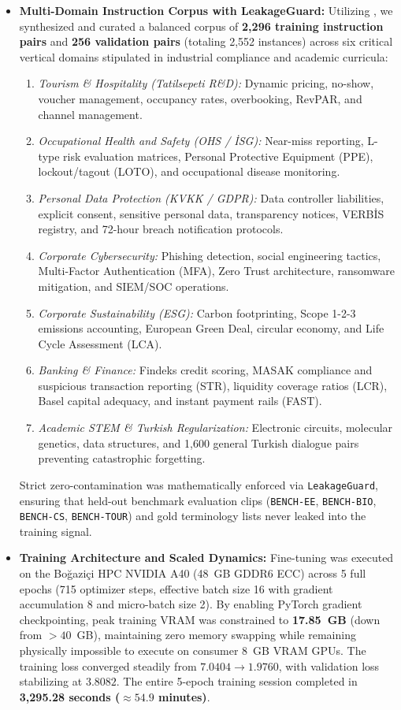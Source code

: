 \documentclass[a4paper,12pt]{report}
\begin{document}
\begin{itemize}
    \item \textbf{Multi-Domain Instruction Corpus with LeakageGuard:} Utilizing , we synthesized and curated a balanced corpus of \textbf{2,296 training instruction pairs} and \textbf{256 validation pairs} (totaling 2,552 instances) across six critical vertical domains stipulated in industrial compliance and academic curricula:
    \begin{enumerate}
        \item \emph{Tourism \& Hospitality (Tatilsepeti R\&D):} Dynamic pricing, no-show, voucher management, occupancy rates, overbooking, RevPAR, and channel management.
        \item \emph{Occupational Health and Safety (OHS / İSG):} Near-miss reporting, L-type risk evaluation matrices, Personal Protective Equipment (PPE), lockout/tagout (LOTO), and occupational disease monitoring.
        \item \emph{Personal Data Protection (KVKK / GDPR):} Data controller liabilities, explicit consent, sensitive personal data, transparency notices, VERBİS registry, and 72-hour breach notification protocols.
        \item \emph{Corporate Cybersecurity:} Phishing detection, social engineering tactics, Multi-Factor Authentication (MFA), Zero Trust architecture, ransomware mitigation, and SIEM/SOC operations.
        \item \emph{Corporate Sustainability (ESG):} Carbon footprinting, Scope 1-2-3 emissions accounting, European Green Deal, circular economy, and Life Cycle Assessment (LCA).
        \item \emph{Banking \& Finance:} Findeks credit scoring, MASAK compliance and suspicious transaction reporting (STR), liquidity coverage ratios (LCR), Basel capital adequacy, and instant payment rails (FAST).
        \item \emph{Academic STEM \& Turkish Regularization:} Electronic circuits, molecular genetics, data structures, and 1,600 general Turkish dialogue pairs preventing catastrophic forgetting.
    \end{enumerate}
    Strict zero-contamination was mathematically enforced via \texttt{LeakageGuard}, ensuring that held-out benchmark evaluation clips (\texttt{BENCH-EE}, \texttt{BENCH-BIO}, \texttt{BENCH-CS}, \texttt{BENCH-TOUR}) and gold terminology lists never leaked into the training signal.

    \item \textbf{Training Architecture and Scaled Dynamics:} Fine-tuning was executed on the Bo\u{g}azi\c{c}i HPC NVIDIA A40 (48~GB GDDR6 ECC) across 5 full epochs (715 optimizer steps, effective batch size 16 with gradient accumulation 8 and micro-batch size 2). By enabling PyTorch gradient checkpointing, peak training VRAM was constrained to \textbf{17.85~GB} (down from $>40$~GB), maintaining zero memory swapping while remaining physically impossible to execute on consumer 8~GB VRAM GPUs. The training loss converged steadily from $7.0404 \to 1.9760$, with validation loss stabilizing at $3.8082$. The entire 5-epoch training session completed in \textbf{3,295.28 seconds ($\approx 54.9$ minutes)}.


\end{itemize}
\end{document}
